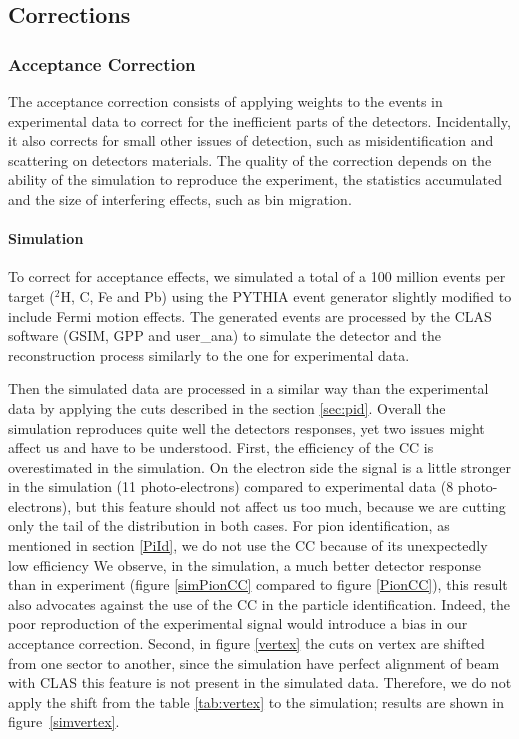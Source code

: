 \subsection{Corrections}
\label{sec:corrections}

\subsubsection{Acceptance Correction}
\label{sec:accept}

The acceptance correction consists of applying weights to the events in 
experimental data to correct for the inefficient parts of the detectors.
Incidentally, it also corrects for small other issues of detection,
such as misidentification and scattering on detectors materials. The quality 
of the correction depends on the ability of the simulation to reproduce the 
experiment, the statistics accumulated and the size of interfering effects, such 
as bin migration.

\paragraph{Simulation}
\label{sec:simul}

To correct for acceptance effects, we simulated a total of a 100 million events 
per target ($^2$H, C, Fe and Pb) using the PYTHIA \cite{Sjostrand:2006za} 
event generator slightly modified to include Fermi motion effects. The 
generated events are processed by the CLAS software (GSIM, GPP and user\_ana) 
to simulate the detector and the reconstruction process similarly to the one for experimental data.

Then the simulated data are processed in a similar way than the experimental data by 
applying the cuts described in the section \ref{sec:pid}. Overall the 
simulation reproduces quite well the detectors responses, yet two issues might 
affect us and have to be understood. First, the efficiency of the CC is overestimated in the simulation. 
On the electron side the signal is a little stronger in the simulation (11 
photo-electrons) compared to experimental data (8 photo-electrons), but this 
feature should not affect us too much, because we are cutting only the tail of the 
distribution in both cases. For pion identification, as mentioned in section \ref{PiId},
we do not use the CC because of its unexpectedly low efficiency 
We observe, in the simulation, a much better detector response than in experiment 
(figure \ref{simPionCC} compared to figure \ref{PionCC}), this result also advocates against the use of the CC in the 
particle identification. Indeed, the poor reproduction of the experimental signal would introduce a bias in our acceptance correction. 
Second, in figure \ref{vertex} the cuts on vertex are shifted from one sector 
to another, since the simulation have perfect alignment of beam with CLAS this 
feature is not present in the simulated data. Therefore, we do not apply the 
shift from the table \ref{tab:vertex} to the simulation; results are shown in 
figure~\ref{simvertex}.

